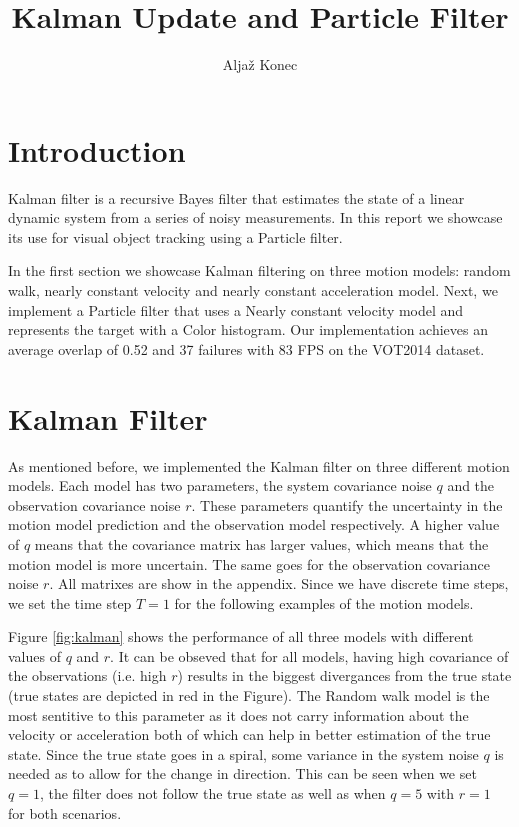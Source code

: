 \documentclass[9pt]{IEEEtran}
\title{\vspace{0ex} Kalman Update and Particle Filter}
\author{Aljaž Konec\vspace{-4.0ex}}
\begin{document}
\maketitle

\section{Introduction}

Kalman filter is a recursive Bayes filter that estimates the state of a linear dynamic system from a series of noisy measurements.
In this report we showcase its use for visual object tracking using a Particle filter.

In the first section we showcase Kalman filtering on three motion models: random walk, nearly constant velocity and nearly constant acceleration model.
Next, we implement a Particle filter that uses a Nearly constant velocity model and represents the target with a Color histogram.
Our implementation achieves an average overlap of 0.52 and 37 failures with 83 FPS on the VOT2014 dataset.

\section{Kalman Filter}
As mentioned before, we implemented the Kalman filter on three different motion models. 
Each model has two parameters, the system covariance noise $q$ and the observation covariance noise $r$.
These parameters quantify the uncertainty in the motion model prediction and the observation model respectively.
A higher value of $q$ means that the covariance matrix has larger values, which means that the motion model is more uncertain.
The same goes for the observation covariance noise $r$.
All matrixes are show in the appendix.
Since we have discrete time steps, we set the time step $T=1$ for the following examples of the motion models.

Figure \ref{fig:kalman} shows the performance of all three models with different values of $q$ and $r$.
It can be obseved that for all models, having high covariance of the observations (i.e. high $r$) results in the biggest divergances from the true state (true states are depicted in red in the Figure).
The Random walk model is the most sentitive to this parameter as it does not carry information about the velocity or acceleration both of which can help in better estimation of the true state.
Since the true state goes in a spiral, some variance in the system noise $q$ is needed as to allow for the change in direction.
This can be seen when we set $q=1$, the filter does not follow the true state as well as when $q=5$ with $r=1$ for both scenarios.
\end{document}
